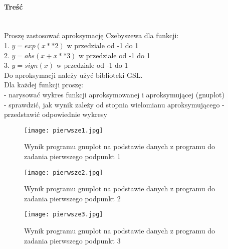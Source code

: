 \paragraph{Treść}~\\
Proszę zastosować aproksymację Czebyszewa dla funkcji:\\
1. $ y = exp(x**2) $ w przedziale od -1 do 1\\
2. $ y = abs(x+x**3) $ w przedziale od -1 do 1\\
3. $ y = sign(x) $ w przedziale od -1 do 1\\
Do aproksymacji należy użyć biblioteki GSL.\\
Dla każdej funkcji proszę:\\
- narysować wykres funkcji aproksymowanej i aproksymującej (gnuplot)\\
- sprawdzić, jak wynik zależy od stopnia wielomianu aproksymującego - przedstawić odpowiednie wykresy\\









\begin{figure}[p]
  \caption{Wynik programu gnuplot na podstawie danych z programu do zadania pierwszego podpunkt 1}
  \label{fig:Pierwsze1Jpg}
  \centering
  \texttt{[image: pierwsze1.jpg]}
\end{figure}

\begin{figure}[p]
  \caption{Wynik programu gnuplot na podstawie danych z programu do zadania pierwszego podpunkt 2}
  \label{fig:Pierwsze2Jpg}
  \centering
  \texttt{[image: pierwsze2.jpg]}
\end{figure}

\begin{figure}[p]
  \caption{Wynik programu gnuplot na podstawie danych z programu do zadania pierwszego podpunkt 3}
  \label{fig:Pierwsze3Jpg}
  \centering
  \texttt{[image: pierwsze3.jpg]}
\end{figure}

